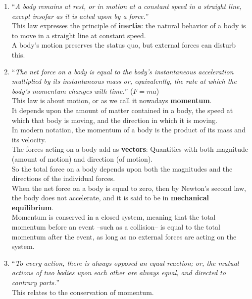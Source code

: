 \begin{enumerate}
    \item ``\textit{A body remains at rest, or in motion at a constant speed in a straight line, except insofar as it is acted upon by a force.}'' \\
    This law expresses the principle of \textbf{\gls{inertia}}: the natural behavior of a body is to move in a straight line at constant speed. \\
    A body's motion preserves the status quo, but external forces can disturb this.
    \item ``\textit{The net force on a body is equal to the body's instantaneous acceleration multiplied by its instantaneous mass or, equivalently, the rate at which the body's momentum changes with time.}'' ($F = ma$) \\
    This law is about motion, or as we call it nowadays \textbf{\gls{momentum}}. \\
    It depends upon the amount of matter contained in a body, the speed at which that body is moving, and the direction in which it is moving. \\
    In modern notation, the momentum of a body is the product of its mass and its velocity. \\
    The forces acting on a body add as \textbf{\gls{vector}s}: Quantities with both magnitude (amount of motion) and direction (of motion). \\
    So the total force on a body depends upon both the magnitudes and the directions of the individual forces. \\
    When the net force on a body is equal to zero, then by Newton's second law, the body does not accelerate, and it is said to be in \textbf{mechanical equilibrium}. \\
    Momentum is conserved in a closed system, meaning that the total momentum before an event --such as a collision-- is equal to the total momentum after the event, as long as no external forces are acting on the system.
    \item ``\textit{To every action, there is always opposed an equal reaction; or, the mutual actions of two bodies upon each other are always equal, and directed to contrary parts.}'' \\
    This relates to the conservation of momentum.
\end{enumerate}

